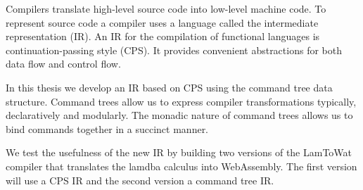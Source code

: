 
Compilers translate high-level source code into low-level machine code. To represent source code a compiler uses a language called the intermediate representation (IR). An IR for the compilation of functional languages is continuation-passing style (CPS). It provides convenient abstractions for both data flow and control flow.

In this thesis we develop an IR based on CPS using the command tree data structure. Command trees allow us to express compiler transformations typically, declaratively and modularly. The monadic nature of command trees allows us to bind commands together in a succinct manner.

We test the usefulness of the new IR by building two versions of the LamToWat compiler that translates the lamdba calculus into WebAssembly. The first version will use a CPS IR and the second version a command tree IR.